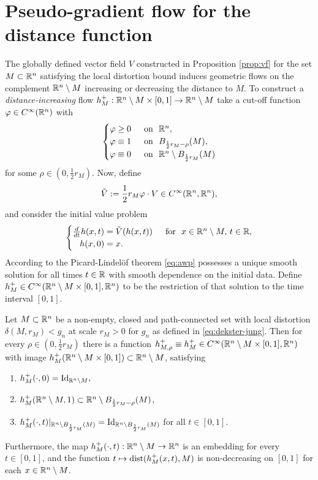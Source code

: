 \section{Pseudo-gradient flow for the distance function}\label{sec:pseudo}
The globally defined vector field $V$ constructed in Proposition \ref{prop:vf}
for the set $M\subset\mathbb{R}^n$ satisfying the local distortion bound induces
geometric flows on the complement $\mathbb{R}^n\setminus M$ increasing or decreasing the distance
to $M$. To construct a \emph{distance-increasing} flow $h_M^+:\mathbb{R}^n\setminus M\times [0,1]\to
\mathbb{R}^n\setminus M$ take a cut-off function $\varphi\in C^\infty(\mathbb{R}^n)$ with
\begin{equation}\label{eq:varphi}
\begin{cases}
\varphi\ge 0 & \,\,\,\text{on }\,\,\mathbb{R}^n,\\
\varphi\equiv 1 & \,\,\,\text{on }\,\, B_{\frac12{r_M}-\rho}(M),\\
\varphi\equiv 0 & \,\,\,\text{on }\,\, \mathbb{R}^n\setminus B_{\frac12{r_M}}(M)
\end{cases}
\end{equation}
for some $\rho\in (0,\frac12{r_M})$. Now, define 
\begin{equation}\label{eq:vtilde}
\tilde{V}:=\frac12 r_M\varphi\cdot V\in C^\infty(\mathbb{R}^n,\mathbb{R}^n),
\end{equation}
and consider the initial value problem
\begin{equation}\label{eq:awp}
\begin{cases}
\frac{d}{dt}h(x,t)=\tilde{V}(h(x,t))&\,\,\,\text{for }\,\, x\in\mathbb{R}^n\setminus M,\,t\in\mathbb{R},\\
\quad\! h(x,0)=x.
\end{cases}
\end{equation}
According to the Picard-Lindel\"of theorem \eqref{eq:awp} possesses a unique
smooth solution for all times $t\in\mathbb{R}$
with smooth dependence on the initial data.
Define $h_M^+\in C^\infty(\mathbb{R}^n\setminus M\times [0,1],\mathbb{R}^n)$ to be the 
restriction of that solution to the time interval $[0,1]$.
\begin{theorem}\label{thm:dist-inc-flow}
Let $M\subset\mathbb{R}^n$ be a non-empty, closed and path-connected set with local distortion
$\delta(M,r_M)<g_n$ at scale $r_M>0$ for $g_n$ as defined in \eqref{eq:dekster-jung}.
Then for every $\rho\in (0,\frac12{r_M})$ there is a function $h_{M,\rho}^+\equiv
h_M^+
\in C^\infty(\mathbb{R}^n\setminus M\times [0,1],\mathbb{R}^n)$ with image $h_M^+(\mathbb{R}^n\setminus
M\times [0,1])\subset \mathbb{R}^n\setminus M$, satisfying
\begin{enumerate}
\item[\rm (1+)] $h_M^+(\cdot,0)={{\rm Id}}_{\mathbb{R}^n\setminus M},$
\item[\rm (2+)] $h_M^+(\mathbb{R}^n\setminus M,1)\subset \mathbb{R}^n\setminus B_{\frac12{r_M}-\rho}(M)$,
\item[\rm (3+)] $h_M^+(\cdot,t)|_{\mathbb{R}^n\setminus B_{\frac12{r_M}}(M)}={{\rm Id}}_{\mathbb{R}^n\setminus
B_{\frac12{r_M}}(M)}$ for all $t\in [0,1]$.
\end{enumerate}
Furthermore, the map $h_M^+(\cdot,t):\mathbb{R}^n\setminus M\to\mathbb{R}^n$ is an
embedding for every $t\in [0,1]$, and the function $t\mapsto\operatorname{dist}(h_M^+(x,t),M)$
is non-decreasing on $[0,1]$ for each $x\in\mathbb{R}^n\setminus M$.
\end{theorem}
